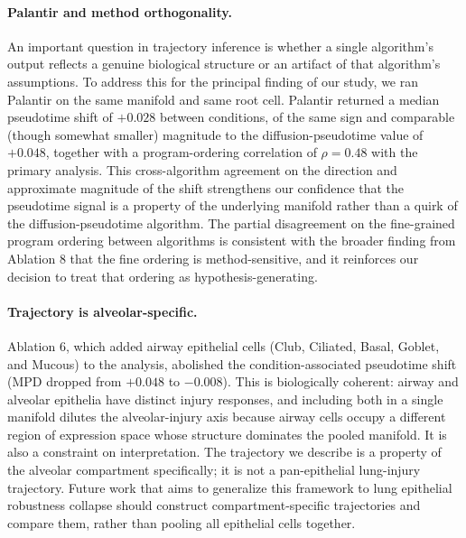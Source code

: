 \documentclass[11pt]{article}
\begin{document}
\paragraph{Palantir and method orthogonality.} An important question in trajectory inference is whether a single algorithm's output reflects a genuine biological structure or an artifact of that algorithm's assumptions. To address this for the principal finding of our study, we ran Palantir \citep{Setty2019} on the same manifold and same root cell. Palantir returned a median pseudotime shift of $+0.028$ between conditions, of the same sign and comparable (though somewhat smaller) magnitude to the diffusion-pseudotime value of $+0.048$, together with a program-ordering correlation of $\rho = 0.48$ with the primary analysis. This cross-algorithm agreement on the direction and approximate magnitude of the shift strengthens our confidence that the pseudotime signal is a property of the underlying manifold rather than a quirk of the diffusion-pseudotime algorithm. The partial disagreement on the fine-grained program ordering between algorithms is consistent with the broader finding from Ablation 8 that the fine ordering is method-sensitive, and it reinforces our decision to treat that ordering as hypothesis-generating.

\paragraph{Trajectory is alveolar-specific.} Ablation 6, which added airway epithelial cells (Club, Ciliated, Basal, Goblet, and Mucous) to the analysis, abolished the condition-associated pseudotime shift (MPD dropped from $+0.048$ to $-0.008$). This is biologically coherent: airway and alveolar epithelia have distinct injury responses, and including both in a single manifold dilutes the alveolar-injury axis because airway cells occupy a different region of expression space whose structure dominates the pooled manifold. It is also a constraint on interpretation. The trajectory we describe is a property of the alveolar compartment specifically; it is not a pan-epithelial lung-injury trajectory. Future work that aims to generalize this framework to lung epithelial robustness collapse should construct compartment-specific trajectories and compare them, rather than pooling all epithelial cells together.
\end{document}
